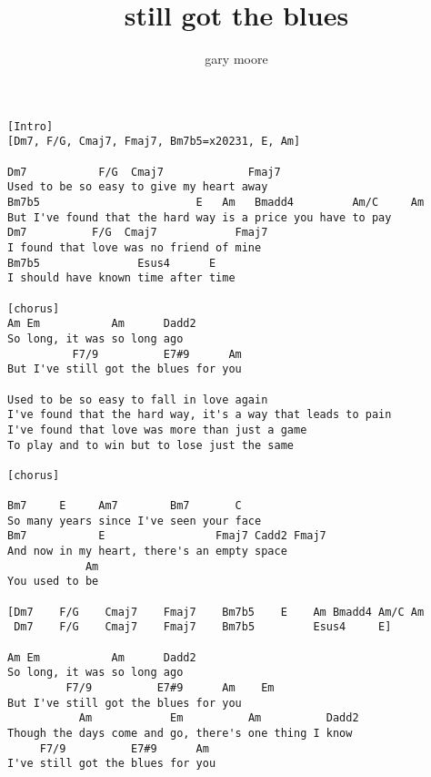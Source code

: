 \author{gary moore}
\title{still got the blues}
\maketitle
\begin{verbatim}
[Intro]
[Dm7, F/G, Cmaj7, Fmaj7, Bm7b5=x20231, E, Am]

Dm7           F/G  Cmaj7             Fmaj7
Used to be so easy to give my heart away
Bm7b5                        E   Am   Bmadd4         Am/C     Am
But I've found that the hard way is a price you have to pay
Dm7          F/G  Cmaj7            Fmaj7
I found that love was no friend of mine
Bm7b5               Esus4      E
I should have known time after time

[chorus]
Am Em           Am      Dadd2
So long, it was so long ago
          F7/9          E7#9      Am
But I've still got the blues for you

Used to be so easy to fall in love again
I've found that the hard way, it's a way that leads to pain
I've found that love was more than just a game
To play and to win but to lose just the same

[chorus]

Bm7     E     Am7        Bm7       C
So many years since I've seen your face
Bm7           E                 Fmaj7 Cadd2 Fmaj7
And now in my heart, there's an empty space
            Am
You used to be

[Dm7    F/G    Cmaj7    Fmaj7    Bm7b5    E    Am Bmadd4 Am/C Am
 Dm7    F/G    Cmaj7    Fmaj7    Bm7b5         Esus4     E]

Am Em           Am      Dadd2
So long, it was so long ago
         F7/9          E7#9      Am    Em
But I've still got the blues for you
           Am            Em          Am          Dadd2
Though the days come and go, there's one thing I know
     F7/9          E7#9      Am
I've still got the blues for you
\end{verbatim}